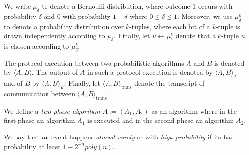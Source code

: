 %
%
\noindent
We write $\mu_{\delta}$ to denote a Bernoulli distribution, where outcome $1$ occurs with
probability $\delta$ and $0$ with probability $1-\delta$ where $0 \leq \delta \leq 1$.
Moreover, we use $\mu_{\delta}^k$ to denote a probability distribution over $k$-tuples,
where each bit of a $k$-tuple is drawn independently according to $\mu_{\delta}$.
Finally, let $u \leftarrow \mu_{\delta}^k$ denote that a $k$-tuple $u$ is chosen according to $\mu_{\delta}^k$.

The protocol execution between two probabilistic algorithms $A$ and $B$ is denoted by $\langle A, B \rangle$.
The output of $A$ in such a protocol execution is denoted by $\langle A, B \rangle_A$ and of $B$ by $\langle A, B \rangle_B$.
Finally, let $\langle A, B \rangle_{\text{trans}}$ denote the transcript of communication between $\langle A, B \rangle_{\text{trans}}$.

We define a \textit{two phase algorithm} $A := (A_1, A_2)$ as an algorithm where in the first phase an algorithm $A_1$
is executed and in the second phase an algorithm $A_2$.

We say that an event happens \textit{almost surely} or with \textit{high probability} if
its has probability at least $1 - 2^{-n} poly(n)$.


